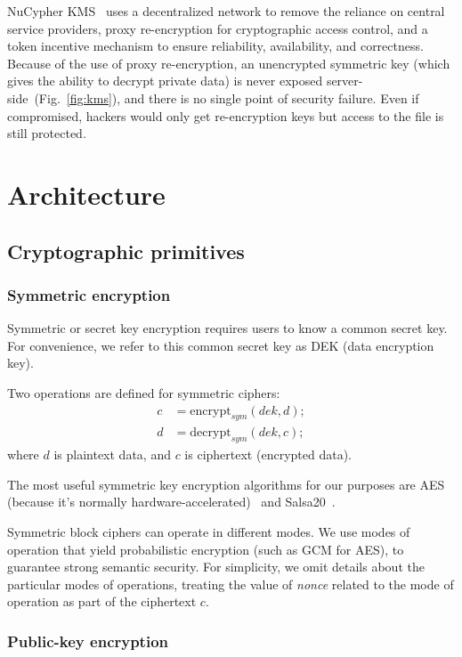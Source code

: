\documentclass[longbibliography,nofootinbib]{revtex4-1}
\newcommand{\kms}{NuCypher KMS}
\newcommand{\figref}[1]{Fig.~\ref{#1}}
\begin{document}
\kms~ uses a decentralized network to remove the reliance on central service providers, proxy re-encryption for cryptographic
access control, and a token incentive mechanism to ensure reliability, availability, and correctness.
Because of the use of proxy re-encryption, an unencrypted symmetric key (which gives the ability to decrypt private data) is never exposed
server-side~(\figref{fig:kms}), and there is no single point of security failure.
Even if compromised, hackers would only get re-encryption keys but access to the file is still protected.

\section{Architecture}

\subsection{Cryptographic primitives}

\subsubsection{Symmetric encryption}

Symmetric or secret key encryption requires users to know a common secret key.
For convenience, we refer to this common secret key as DEK (data encryption key).

Two operations are defined for symmetric ciphers:
\begin{align}
    c &= \text{encrypt}_{sym}(dek, d);\\
    d &= \text{decrypt}_{sym}(dek, c);
\end{align}
where $d$ is plaintext data, and $c$ is ciphertext (encrypted data).

The most useful symmetric key encryption algorithms for our purposes are AES (because it's normally hardware-accelerated)~\cite{wiki:aes}
and Salsa20~\cite{wiki:salsa20}.

Symmetric block ciphers can operate in different modes.
We use modes of operation that yield probabilistic encryption (such as GCM for AES), to guarantee strong semantic security.
For simplicity, we omit details about the particular modes of operations, treating the value of \emph{nonce} related to the mode of operation as part of the
ciphertext $c$.

\subsubsection{Public-key encryption}
\end{document}
